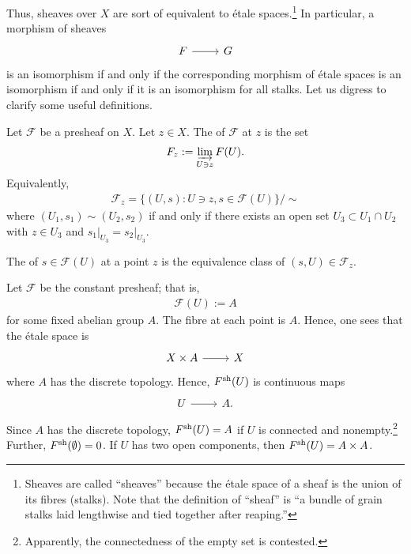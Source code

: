 \documentclass [11 pt, oneside] {article}
\begin{document}
Thus, sheaves over $X$ are sort of equivalent to \'etale spaces.\footnote{Sheaves are called ``sheaves'' because the \'etale space of a sheaf is the union of its fibres (stalks). Note that the definition of ``sheaf'' is ``a bundle of grain stalks laid lengthwise and tied together after reaping.''} In particular, a morphism of sheaves 
\[
\begin{tikzcd}
\mathscr{F}\ar[r]& \mathscr{G}
\end{tikzcd}
\]
is an isomorphism if and only if the corresponding morphism of \'etale spaces is an isomorphism if and only if it is an isomorphism for all stalks. Let us digress to clarify some useful definitions.

 \begin{definition}[ ]\label{}\text{}
Let $\mathscr{F}$ be a presheaf on $X$. Let $z\in X$. The  of $\mathscr{F}$ at $z$ is the set
\begin{align*}
	\mathscr{F}_z := \varinjlim_{U\ni z} \mathscr{F}(U).
\end{align*}
Equivalently,
\begin{align*}
	\mathscr{F}_z= \{(U,s) : U\ni z, s\in  \mathscr{F}(U)\} / \sim
\end{align*}
where $(U_1,s_1)\sim(U_2,s_2) $ if and only if there exists an open set $U_3 \subset U_1\cap U_2$ with $z\in U_3$ and $s_1\big |_{U_3} = s_2\big |_{U_3}$.
\end{definition}

\begin{definition}[ ]\label{}\text{}
The  of $s\in \mathscr{F}(U)$ at a point $z$ is the equivalence class of $(s,U) \in  \mathscr{F}_z$.
\end{definition}

\begin{example}[Sheafification]\label{}\text{}
Let $\mathscr{F}$ be the constant presheaf; that is,
\begin{align*}
	\mathscr{F}(U) := A
\end{align*}
for some fixed abelian group $A$. The fibre at each point is $A$. Hence, one sees that the \'etale space is 
\[
\begin{tikzcd}
X\times A \ar[r]& X
\end{tikzcd}
\]
where $A$ has the discrete topology. Hence, $\mathscr{F}\sh(U)$ is continuous maps 
\[
\begin{tikzcd}
U\ar[r]&A.
\end{tikzcd}
\]
Since $A$ has the discrete topology, $\mathscr{F}\sh(U)=A$ if $U$ is connected and nonempty.\footnote{Apparently, the connectedness of the empty set is contested.} Further, $\mathscr{F}\sh(\emptyset ) = 0$. If $U$ has two open components, then $\mathscr{F}\sh(U) = A\times A$. 
\end{example}
\end{document}
